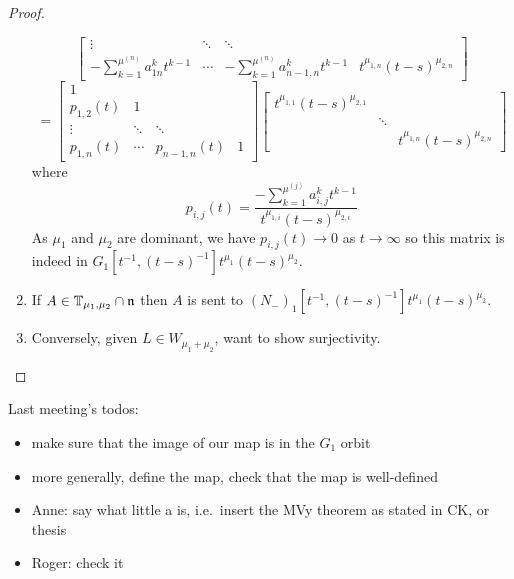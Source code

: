 \documentclass{article}
\begin{document}
\begin{proof}
\begin{enumerate}[label = Step \arabic*:]
\[\begin{bmatrix}
    \vdots & \ddots & \ddots \\
    -\sum_{k=1}^{\mu^{(n)}} a_{1n}^k t^{k-1} & \cdots & -\sum_{k=1}^{\mu^{(n)}} a_{n-1,n}^k t^{k-1} & t^{\mu_{1,n}} (t-s)^{\mu_{2,n}}
\end{bmatrix}
\]
\[
= \begin{bmatrix}
    1 \\
    p_{1,2}(t) & 1 \\
    \vdots & \ddots & \ddots \\
    p_{1,n}(t) & \cdots & p_{n-1,n}(t) & 1
\end{bmatrix}
\begin{bmatrix}
    t^{\mu_{1,1}}(t-s)^{\mu_{2,1}} \\
     & \ddots \\
     & & t^{\mu_{1,n}} (t-s)^{\mu_{2,n}}
\end{bmatrix}
\]
where 
\[p_{i,j}(t) = \frac{-\sum_{k=1}^{\mu^{(j)}} a_{i,j}^k t^{k-1}} {t^{\mu_{1,i}} (t-s)^{\mu_{2,i}}}\]
As $\mu_1$ and $\mu_2$ are dominant, we have $p_{i,j}(t) \rightarrow 0$ as $t \rightarrow \infty$ so this matrix is indeed in $G_1[t^{-1},(t-s)^{-1}]t^{\mu_1}(t-s)^{\mu_2}$.

    \item If $A \in \mathbb T_{\mu_1,\mu_2} \cap \mathfrak n$ then $A$ is sent to $(N_-)_1[t^{-1}, (t-s)^{-1}] t^{\mu_1} (t-s)^{\mu_2}$. 

    \item Conversely, given $L \in W_{\mu_1 + \mu_2}$, want to show surjectivity.
\end{enumerate}
\end{proof}

Last meeting's todos:
\begin{itemize}
    \item make sure that the image of our map is in the $G_1$ orbit
    \item more generally, define the map, check that the map is well-defined
    \item Anne: say what little a is, i.e.\ insert the MVy theorem as stated in CK, or thesis
    \item Roger: check it
\end{itemize}





\end{document}
